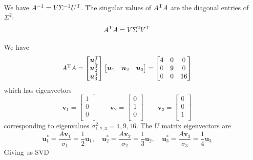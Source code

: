 \documentclass[a4paper]{article}
\begin{document}
We have \(A^{-1} = V \Sigma^{-1} U^{\textsc{T}}\). The singular values of \(A^{\textsc{T}}A\) are the diagonal entries of \(\Sigma^{2}\):
\[
	A^{\textsc{T}}A = V \Sigma^{2} V^{\textsc{T}}
\]

\vspace{12pt}


We have
\[
	A^{\textsc{T}}A = 
	\begin{bmatrix}
		\bm{u}_{1}^{\textsc{T}} \\
		\bm{u}_{2}^{\textsc{T}} \\
		\bm{u}_{3}^{\textsc{T}} \\
	\end{bmatrix}
	\begin{bmatrix}
		\bm{u}_{1} & \bm{u}_{2} & \bm{u}_{3} \\
	\end{bmatrix} =
	\begin{bmatrix}
		4 & 0 & 0 \\
		0 & 9 & 0 \\
		0 & 0 & 16 \\
	\end{bmatrix}
\]
which has eigenvectors
\[
	\bm{v}_{1} =
	\begin{bmatrix}
		1 \\
		0 \\
		0 \\
	\end{bmatrix}
	\qquad
	\bm{v}_{2} =
	\begin{bmatrix}
		0 \\
		1 \\
		0 \\
	\end{bmatrix}
	\qquad
	\bm{v}_{3} =
	\begin{bmatrix}
		0 \\
		0 \\
		1 \\
	\end{bmatrix}
\]
corresponding to eigenvalues \(\sigma_{1,2,3}^{2} = 4, 9, 16\). The \(U\) matrix eigenvectors are
\[
	\bm{u}_{1}^{*} = \frac{A \bm{v}_{1}}{\sigma_{1}} = \frac{1}{2}\bm{u}_{1}, \quad \bm{u}_{2}^{*} = \frac{A \bm{v}_{2}}{\sigma_{2}} = \frac{1}{3}\bm{u}_{2}, \quad \bm{u}_{3}^{*} = \frac{A \bm{v}_{3}}{\sigma_{3}} = \frac{1}{4} \bm{u}_{3} 
\]
Giving us SVD
\end{document}
